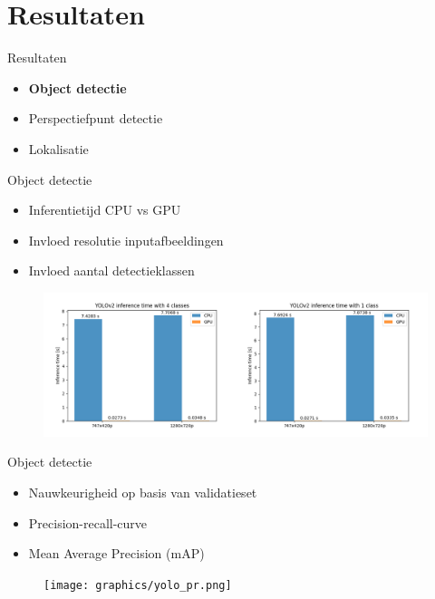 \documentclass[11pt,t]{beamer}
\begin{document}
\section{Resultaten}
%
%
\begin{frame}[fragile]{Resultaten}
	\begin{itemize}
		\item \textbf{Object detectie}
		\item Perspectiefpunt detectie
		\item Lokalisatie
	\end{itemize}
\end{frame}

\begin{frame}[fragile]{Object detectie}
	\begin{itemize}
		\item Inferentietijd CPU vs GPU
		\item Invloed resolutie inputafbeeldingen
		\item Invloed aantal detectieklassen
	\end{itemize}

	\begin{figure}
		\centering
		\includegraphics[width=\linewidth]{graphics/yolo_bar.png}
	\end{figure}
\end{frame}

\begin{frame}[fragile]{Object detectie}
	\begin{itemize}
		\item Nauwkeurigheid op basis van validatieset
		\item Precision-recall-curve
		\item Mean Average Precision (mAP)
	\end{itemize}

	\begin{figure}
		\centering
		\texttt{[image: graphics/yolo\_pr.png]}
	\end{figure}
\end{frame}
\end{document}
